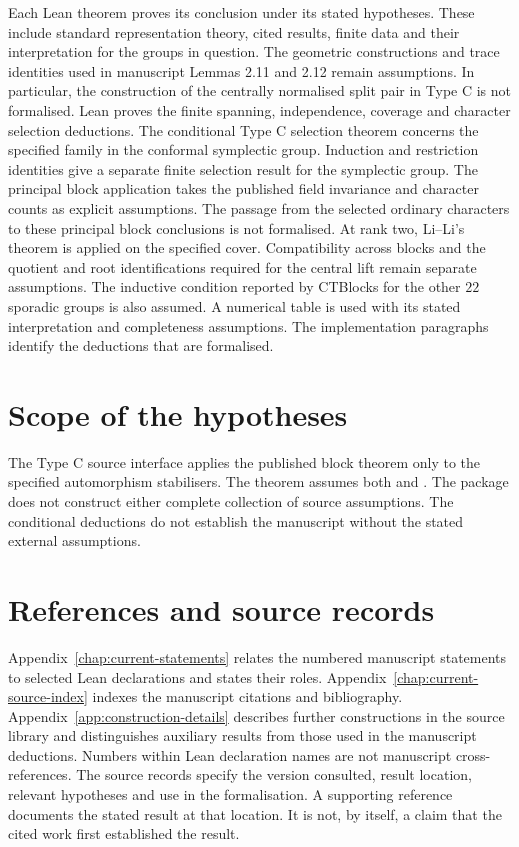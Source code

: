 Each Lean theorem proves its conclusion under its stated hypotheses.
These include standard representation theory, cited results, finite
data and their interpretation for the groups in question. The geometric
constructions and trace identities used in manuscript Lemmas 2.11 and
2.12 remain assumptions. In particular, the construction of the centrally
normalised split pair in Type C is not formalised. Lean proves the finite spanning, independence,
coverage and character selection deductions. The conditional Type C
selection theorem concerns the specified family in the conformal
symplectic group. Induction and restriction identities give a separate
finite selection result for the symplectic group. The principal block
application takes the published field invariance and character counts
as explicit assumptions. The passage from the selected ordinary
characters to these principal block conclusions is not formalised.
At rank two, Li--Li's theorem is applied on the specified cover.
Compatibility across blocks and the quotient and root identifications
required for the central lift remain separate assumptions.
The inductive condition reported by CTBlocks
for the other $22$ sporadic groups is also assumed. A numerical table is
used with its stated interpretation and completeness assumptions.
The implementation paragraphs identify the deductions that are formalised.

\section{Scope of the hypotheses}

The Type C source interface applies the published block theorem only to
the specified automorphism stabilisers.
The theorem  assumes both
 and .
The package does not construct either complete collection of source
assumptions. The conditional deductions do not establish the manuscript
without the stated external assumptions.

\section{References and source records}

Appendix~\ref{chap:current-statements} relates the numbered manuscript
statements to selected Lean declarations and states their roles.
Appendix~\ref{chap:current-source-index} indexes the manuscript citations
and bibliography. Appendix~\ref{app:construction-details} describes
further constructions in the source library and distinguishes auxiliary
results from those used in the manuscript deductions.
Numbers within Lean declaration names are not
manuscript cross-references. The source
records specify the version consulted, result location, relevant
hypotheses and use in the formalisation. A supporting reference
documents the stated result at that location. It is not, by itself,
a claim that the cited work first established the result.

